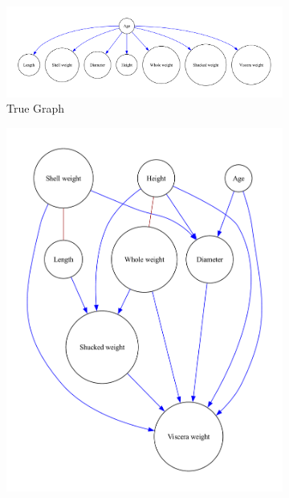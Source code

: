 \documentclass{article}
\begin{document}
\begin{figure}[H]
    \centering
    \begin{subfigure}{0.3\textwidth}
        \centering
        \vspace{-0.5cm}
        \includegraphics[width=\linewidth]{data/dataset/Abalone/output_graph/true_graph.pdf}
        \vfill
        \caption{True Graph}
        \label{fig:sub1}
    \end{subfigure}
    \hspace{0.04\textwidth}
    \begin{subfigure}{0.3\textwidth}
        \centering
        \vspace{-0.5cm}
        \includegraphics[width=\linewidth]{data/dataset/Abalone/output_graph/initial_graph.pdf}

\end{subfigure}
\end{figure}
\end{document}

